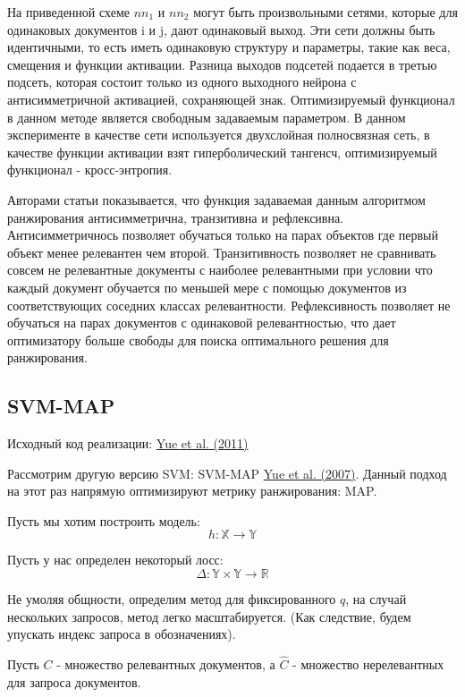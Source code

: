 \documentclass{article}[16pt]
\newcommand{\bibref}[3]{\hyperlink{#1}{#2 (#3)}}
\begin{document}
	На приведенной схеме $nn_1$ и $nn_2$ могут быть произвольными сетями, которые для одинаковых документов i и j, дают одинаковый выход. Эти сети должны быть идентичными, то есть иметь одинаковую структуру и параметры, такие как веса, смещения и функции активации. Разница выходов подсетей подается в третью подсеть, которая состоит только из одного выходного нейрона с антисимметричной активацией, сохраняющей знак. Оптимизируемый функционал в данном методе является свободным задаваемым параметром.
	В данном эксперименте в качестве сети используется двухслойная полносвязная сеть, в качестве функции активации взят гиперболический тангенсч, оптимизируемый функционал - кросс-энтропия.

	Авторами статьи показывается, что функция задаваемая данным алгоритмом ранжирования антисимметрична, транзитивна и рефлексивна.
	Антисимметричнось позволяет обучаться только на парах объектов где первый объект менее релевантен чем второй. 
	Транзитивность позволяет не сравнивать совсем не релевантные документы с наиболее релевантными при условии что каждый документ обучается по меньшей мере с помощью документов из соответствующих соседних классах релевантности. 
	Рефлексивность позволяет не обучаться на парах документов с одинаковой релевантностью, что дает оптимизатору больше свободы для поиска оптимального решения для ранжирования.
	\subsection{SVM-MAP}
	Исходный код реализации: \bibref{svmmap_source}{Yue et al.}{2011}
	
	Рассмотрим другую версию SVM: SVM-MAP \bibref{svmmap}{Yue et al.}{2007}. Данный подход на этот раз напрямую оптимизируют метрику ранжирования: MAP. 
	
	Пусть мы хотим построить модель:
	\begin{equation}
		h: \mathbb{X} \rightarrow \mathbb{Y}
	\end{equation}
	
	Пусть у нас определен некоторый лосс:
	\begin{equation}
		\Delta: \mathbb{Y}\times\mathbb{Y} \rightarrow \mathbb{R}
	\end{equation}
	
	Не умоляя общности, определим метод для фиксированного $q$, на случай нескольких запросов, метод легко масштабируется. (Как следствие, будем упускать индекс запроса в обозначениях).
	
	Пусть $C$ - множество релевантных документов, а $\hat{C}$ - множество нерелевантных для запроса документов.
	
\end{document}
